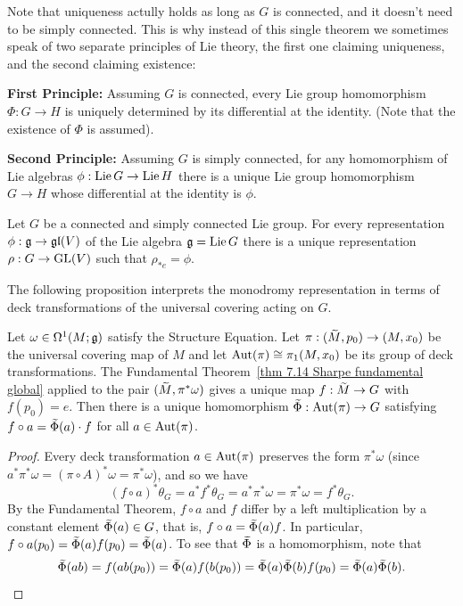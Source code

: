 \begin{rem}
    Note that uniqueness actully holds as long as $G$ is connected, and it doesn't need to be simply connected. This is why instead of this single theorem we sometimes speak of two separate principles of Lie theory, the first one claiming uniqueness, and the second claiming existence:

    \textbf{First Principle:} Assuming $G$ is connected, every Lie group homomorphism $\Phi:G\to H$ is uniquely determined by its differential at the identity. (Note that the existence of $\Phi$ is assumed).

    \textbf{Second Principle:} Assuming $G$ is simply connected, for any homomorphism of Lie algebras $\phi:\operatorname{Lie} G\to \operatorname{Lie} H$ there is a unique Lie group homomorphism $G\to H$ whose differential at the identity is $\phi$.
\end{rem}

\begin{cor}\label{cor generated homomorphism}
    Let $G$ be a connected and simply connected Lie group. For every representation $\phi:\mathfrak{g}\to \mathfrak{gl}(V)$ of the Lie algebra $\mathfrak{g}=\operatorname{Lie} G$ there is a unique representation $\rho:G\to \operatorname{GL}(V)$ such that $\rho_{\ast e}=\phi$.
\end{cor}

The following proposition interprets the monodromy representation in terms of deck transformations of the universal covering acting on $G$.

\begin{prop}\label{prop 8.1 Sharpe}
    Let $\omega\in\Omega^1(M;\mathfrak{g})$ satisfy the Structure Equation. Let $\pi:(\wt{M},p_0)\to (M,x_0)$ be the universal covering map of $M$ and let $\operatorname{Aut}(\pi)\cong \pi_1(M,x_0)$ be its group of deck transformations. The Fundamental Theorem~\ref{thm 7.14 Sharpe fundamental global} applied to the pair $(\wt{M},\pi^\ast\omega)$ gives a unique map $f:\wt{M}\to G$ with $f(p_0)=e$. Then there is a unique homomorphism $\wt{\Phi}: \Aut(\pi)\to G$ satisfying $f\circ a=\wt{\Phi}(a)\cdot f$ for all $a\in\operatorname{Aut}(\pi)$.
\end{prop}
\begin{proof}
    Every deck transformation $a\in \operatorname{Aut}(\pi)$ preserves the form $\pi^\ast\omega$ (since $a^\ast \pi^\ast\omega=(\pi\circ A)^\ast\omega=\pi^\ast\omega$), and so we have
    \[(f\circ a)^\ast\theta_G=a^\ast f^\ast\theta_G=a^\ast \pi^\ast\omega=\pi^\ast\omega=f^\ast\theta_G.\]
    By the Fundamental Theorem, $f\circ a$ and $f$ differ by a left multiplication by a constant element $\wt{\Phi}(a)\in G$, that is, $f\circ a=\wt{\Phi}(a)f$. In particular, $f\circ a(p_0)=\wt{\Phi}(a)f(p_0)=\wt{\Phi}(a)$. To see that $\wt{\Phi}$ is a homomorphism, note that 
    \[\wt{\Phi}(ab)=f(ab(p_0))=\wt{\Phi}(a)f(b(p_0))=\wt{\Phi}(a)\wt{\Phi}(b)f(p_0)=\wt{\Phi}(a)\wt{\Phi}(b).\]
\end{proof}

